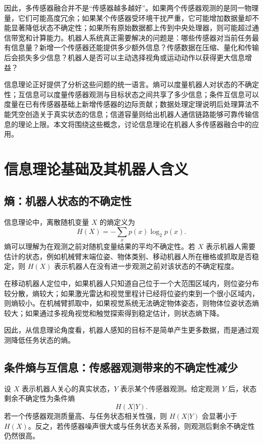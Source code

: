 \documentclass[UTF8,a4paper,12pt]{ctexart}
\begin{document}
因此，多传感器融合并不是“传感器越多越好”。如果两个传感器观测的是同一物理量，它们可能高度冗余；如果某个传感器受环境干扰严重，它可能增加数据量却不能显著降低状态不确定性；如果所有原始数据都上传到中央处理器，则可能超过通信带宽和计算能力。机器人系统真正需要解决的问题是：哪些传感器对当前任务最有信息量？新增一个传感器还能提供多少额外信息？传感数据在压缩、量化和传输后会损失多少信息？机器人是否可以主动选择视角或运动动作以获得更大信息增益？

信息理论正好提供了分析这些问题的统一语言。熵可以度量机器人对状态的不确定性；互信息可以度量传感器观测与目标状态之间共享了多少信息；条件互信息可以度量在已有传感器基础上新增传感器的边际贡献；数据处理定理说明后处理算法不能凭空创造关于真实状态的信息；信道容量则给出机器人通信链路能够可靠传输信息的理论上限。本文将围绕这些概念，讨论信息理论在机器人多传感器融合中的应用。

\section{信息理论基础及其机器人含义}

\subsection{熵：机器人状态的不确定性}

信息理论中，离散随机变量 $X$ 的熵定义为
\begin{equation}
H(X)=-\sum_x p(x)\log_2 p(x).
\end{equation}
熵可以理解为在观测之前对随机变量结果的平均不确定性。若 $X$ 表示机器人需要估计的状态，例如机械臂末端位姿、物体类别、移动机器人所在栅格或抓取是否稳定，则 $H(X)$ 表示机器人在没有进一步观测之前对该状态的不确定程度。

在移动机器人定位中，如果机器人只知道自己位于一个大范围区域内，则位姿分布较分散，熵较大；如果激光雷达和视觉里程计已经将位姿约束到一个很小区域内，则熵较小。在机械臂抓取中，如果视觉系统无法确定物体姿态，则物体位姿状态熵较大；如果通过多视角视觉和触觉探索得到稳定估计，则状态熵下降。

因此，从信息理论角度看，机器人感知的目标不是简单产生更多数据，而是通过观测降低任务状态的熵。

\subsection{条件熵与互信息：传感器观测带来的不确定性减少}

设 $X$ 表示机器人关心的真实状态，$Y$ 表示某个传感器观测。给定观测 $Y$ 后，状态剩余不确定性为条件熵
\begin{equation}
H(X|Y).
\end{equation}
若一个传感器观测质量高、与任务状态相关性强，则 $H(X|Y)$ 会显著小于 $H(X)$。反之，若传感器噪声很大或与任务状态关系弱，则观测后剩余不确定性仍然很高。
\end{document}
